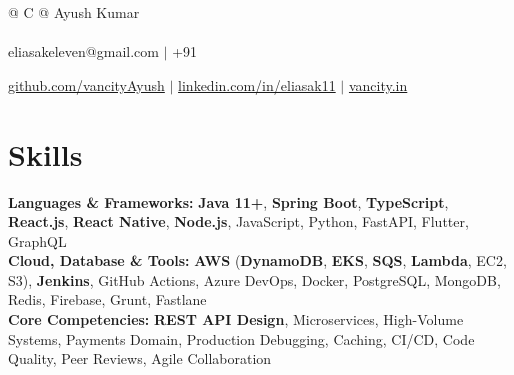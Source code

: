 \documentclass[a4paper,8pt]{article}
\begin{document}
\pagestyle{empty} 


\begin{tabularx}{\linewidth}{@{} C @{}}
\color[HTML]{1C033C} \Huge{Ayush Kumar} \\[6pt]
\\
\textcolor[HTML]{371e77}{{{{\faEnvelope} eliasakeleven@gmail.com}} $|$}
\textcolor[HTML]{371e77}{{{\faMobile} +91}}

\textcolor[HTML]{371e77}{\underline{{\raisebox{-0.05\height}{\faGithub} github.com/vancityAyush}} $|$}
\textcolor[HTML]{371e77}{\underline{{\raisebox{-0.05\height}{\faLinkedin} linkedin.com/in/eliasak11}} $|$}
\textcolor[HTML]{371e77}{\underline{{\raisebox{-0.05\height}{\faGlobe} vancity.in}}}
\end{tabularx}

\section{Skills}
\color[HTML]{1C033C}\textbf{Languages \& Frameworks:} \textbf{Java 11+}, \textbf{Spring Boot}, \textbf{TypeScript}, \textbf{React.js}, \textbf{React Native}, \textbf{Node.js}, JavaScript, Python, FastAPI, Flutter, GraphQL\\[3pt]
\color[HTML]{1C033C}\textbf{Cloud, Database \& Tools:} \textbf{AWS} (\textbf{DynamoDB}, \textbf{EKS}, \textbf{SQS}, \textbf{Lambda}, EC2, S3), \textbf{Jenkins}, GitHub Actions, Azure DevOps, Docker, PostgreSQL, MongoDB, Redis, Firebase, Grunt, Fastlane\\[3pt]
\color[HTML]{1C033C}\textbf{Core Competencies:} \textbf{REST API Design}, Microservices, High-Volume Systems, Payments Domain, Production Debugging, Caching, CI/CD, Code Quality, Peer Reviews, Agile Collaboration\\[3pt]

\end{document}
